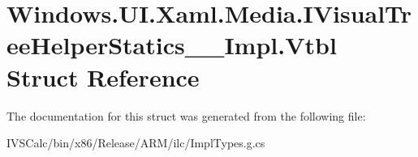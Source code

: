 \hypertarget{struct_windows_1_1_u_i_1_1_xaml_1_1_media_1_1_i_visual_tree_helper_statics_____impl_1_1_vtbl}{}\section{Windows.\+U\+I.\+Xaml.\+Media.\+I\+Visual\+Tree\+Helper\+Statics\+\_\+\+\_\+\+Impl.\+Vtbl Struct Reference}
\label{struct_windows_1_1_u_i_1_1_xaml_1_1_media_1_1_i_visual_tree_helper_statics_____impl_1_1_vtbl}


The documentation for this struct was generated from the following file\+:\begin{DoxyCompactItemize}
\item 
I\+V\+S\+Calc/bin/x86/\+Release/\+A\+R\+M/ilc/Impl\+Types.\+g.\+cs\end{DoxyCompactItemize}
